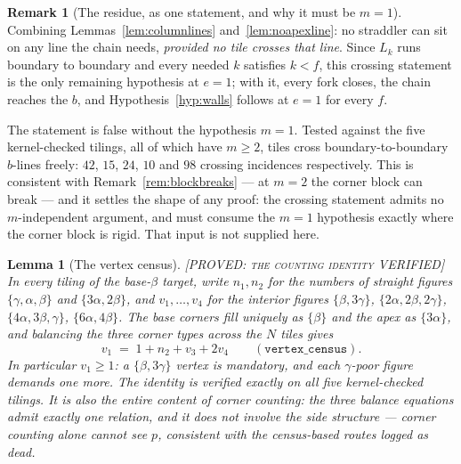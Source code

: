 \documentclass[11pt,reqno]{amsart}
\theoremstyle{plain}
\newtheorem{lemma}[theorem]{Lemma}
\theoremstyle{definition}
\newtheorem{remark}[theorem]{Remark}
\newcommand{\lab}[1]{\hfill\textnormal{\footnotesize\textsc{[#1]}}}
\begin{document}
\begin{remark}[The residue, as one statement, and why it must be $m=1$]\label{rem:onegap}
Combining Lemmas~\ref{lem:columnlines} and~\ref{lem:noapexline}: no straddler can sit on any line
the chain needs, \emph{provided no tile crosses that line}. Since $L_k$ runs boundary to boundary
and every needed $k$ satisfies $k<f$, this crossing statement is the only remaining hypothesis at
$e=1$; with it, every fork closes, the chain reaches the $b$, and Hypothesis~\ref{hyp:walls}
follows at $e=1$ for every $f$.

The statement is false without the hypothesis $m=1$. Tested against the five kernel-checked
tilings, all of which have $m\ge2$, tiles cross boundary-to-boundary $b$-lines freely: $42$, $15$,
$24$, $10$ and $98$ crossing incidences respectively. This is consistent with
Remark~\ref{rem:blockbreaks} --- at $m=2$ the corner block can break --- and it settles the shape
of any proof: the crossing statement admits no $m$-independent argument, and must consume the
$m=1$ hypothesis exactly where the corner block is rigid. That input is not supplied here.
\end{remark}

\begin{lemma}[The vertex census]\label{lem:census}\lab{PROVED: the counting identity VERIFIED}
In every tiling of the base-$\beta$ target, write $n_1,n_2$ for the numbers of straight figures
$\{\gamma,\alpha,\beta\}$ and $\{3\alpha,2\beta\}$, and $v_1,\dots,v_4$ for the interior figures
$\{\beta,3\gamma\}$, $\{2\alpha,2\beta,2\gamma\}$, $\{4\alpha,3\beta,\gamma\}$, $\{6\alpha,4\beta\}$.
The base corners fill uniquely as $\{\beta\}$ and the apex as $\{3\alpha\}$, and balancing the
three corner types across the $N$ tiles gives
\[ v_1 \;=\; 1 + n_2 + v_3 + 2v_4 \qquad(\texttt{vertex\_census}). \]
In particular $v_1\ge1$: a $\{\beta,3\gamma\}$ vertex is mandatory, and each $\gamma$-poor figure
demands one more. The identity is verified exactly on all five kernel-checked tilings. It is also
the \emph{entire} content of corner counting: the three balance equations admit exactly one
relation, and it does not involve the side structure --- corner counting alone cannot see $p$,
consistent with the census-based routes logged as dead.
\end{lemma}
\end{document}
